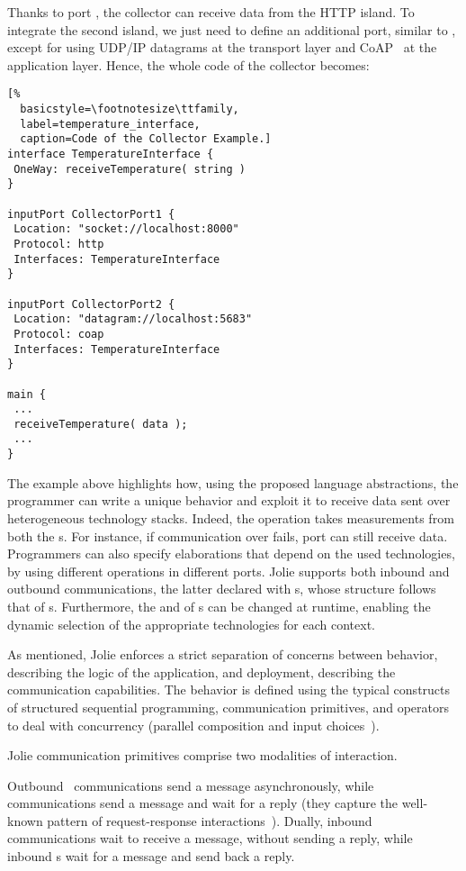 Thanks to port , the collector can receive data from the
HTTP island. To integrate the second island, we just need to define an
additional port, similar to , except for using UDP/IP
datagrams at the transport layer and CoAP~\cite{doi:10.17487/RFC7252,coap} at
the application layer. Hence, the whole code of the collector becomes:
%
\begin{lstlisting}[%
  basicstyle=\footnotesize\ttfamily,
  label=temperature_interface,
  caption=Code of the Collector Example.]
interface TemperatureInterface {
 OneWay: receiveTemperature( string )
}

inputPort CollectorPort1 {
 Location: "socket://localhost:8000"
 Protocol: http
 Interfaces: TemperatureInterface
}

inputPort CollectorPort2 {
 Location: "datagram://localhost:5683"
 Protocol: coap
 Interfaces: TemperatureInterface
}

main {
 ...
 receiveTemperature( data );
 ...
}
\end{lstlisting}
%
The example above highlights how, using the proposed language abstractions, the
programmer can write a unique behavior and exploit it to receive data sent over
heterogeneous technology stacks. Indeed, the  operation
takes measurements from both the s.
%
For instance, if communication over  fails, port
 can still receive data.
%
Programmers can also specify elaborations that depend on the used technologies,
by using different operations in different ports. Jolie supports both inbound
and outbound communications, the latter declared with s, whose
structure follows that of s. Furthermore, the 
and  of s can be changed at runtime, enabling
the dynamic selection of the appropriate technologies for each context.

As mentioned, Jolie enforces a strict separation of concerns between behavior,
describing the logic of the application, and deployment, describing the
communication capabilities. The behavior is defined using the typical constructs
of structured sequential programming, communication primitives, and operators to
deal with concurrency (parallel composition and input
choices~\cite{MontesiGZ14}).

Jolie communication primitives comprise two modalities of interaction.

Outbound~ communications send a message asynchronously, while
 communications send a message and wait for a reply (they
capture the well-known pattern of request-response interactions~\cite{req-rep}).
Dually, inbound  communications wait to receive a message, without
sending a reply, while inbound s wait for a message and
send back a reply.

